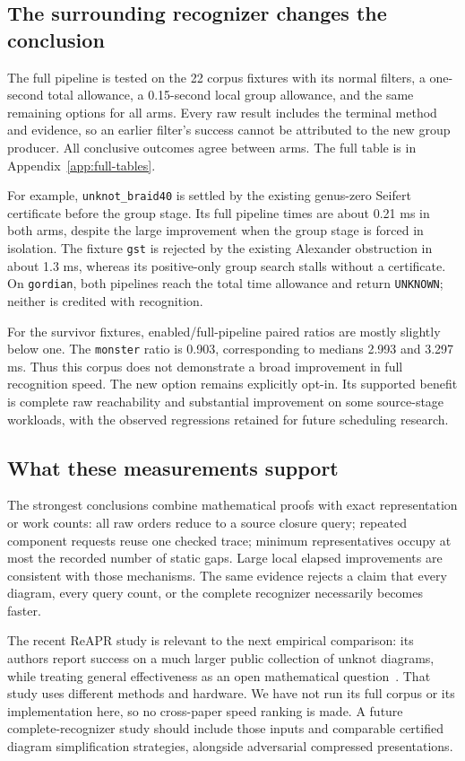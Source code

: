 \subsection{The surrounding recognizer changes the conclusion}

The full pipeline is tested on the 22 corpus fixtures with its normal
filters, a one-second total allowance, a 0.15-second local group
allowance, and the same remaining options for all arms. Every raw result
includes the terminal method and evidence, so an earlier filter's success
cannot be attributed to the new group producer. All conclusive outcomes
agree between arms. The full table is in
Appendix~\ref{app:full-tables}.

For example, \texttt{unknot\_braid40} is settled by the existing
genus-zero Seifert certificate before the group stage. Its full pipeline
times are about 0.21 ms in both arms, despite the large improvement when
the group stage is forced in isolation. The fixture \texttt{gst} is
rejected by the existing Alexander obstruction in about 1.3 ms, whereas
its positive-only group search stalls without a certificate. On
\texttt{gordian}, both pipelines reach the total time allowance and return
\texttt{UNKNOWN}; neither is credited with recognition.

For the survivor fixtures, enabled/full-pipeline paired ratios are mostly
slightly below one. The \texttt{monster} ratio is 0.903, corresponding
to medians 2.993 and 3.297 ms. Thus this corpus does not demonstrate a
broad improvement in full recognition speed. The new option remains
explicitly opt-in. Its supported benefit is complete raw reachability
and substantial improvement on some source-stage workloads, with the
observed regressions retained for future scheduling research.



\subsection{What these measurements support}

The strongest conclusions combine mathematical proofs with exact
representation or work counts: all raw orders reduce to a source closure
query; repeated component requests reuse one checked trace; minimum
representatives occupy at most the recorded number of static gaps.
Large local elapsed improvements are consistent with those mechanisms.
The same evidence rejects a claim that every diagram, every query count,
or the complete recognizer necessarily becomes faster.

The recent ReAPR study is relevant to the next empirical comparison:
its authors report success on a much larger public collection of unknot
diagrams, while treating general effectiveness as an open mathematical
question~\cite{reapr}. That study uses different methods and hardware.
We have not run its full corpus or its implementation here, so no
cross-paper speed ranking is made. A future complete-recognizer study
should include those inputs and comparable certified diagram
simplification strategies, alongside adversarial compressed presentations.
